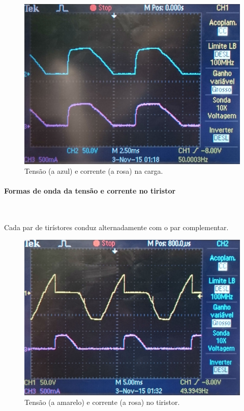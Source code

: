 \documentclass[a4paper,11pt]{article}
\numberwithin{equation}{section}
\begin{document}
\begin{figure}[H]
	\centering
	\includegraphics[keepaspectratio=true, scale=0.13]{img/DSC_0182}
	\caption{Tensão (a azul) e corrente (a rosa) na carga.}
	\label{fig:tccarga}
	\vspace{-0.8em}
\end{figure}

\paragraph{Formas de onda da tensão e corrente no tiristor} \mbox{}\

Cada par de tirístores conduz alternadamente com o par complementar.

\begin{figure}[H]
	\centering
	\includegraphics[keepaspectratio=true, scale=0.13]{img/DSC_0183}
	\caption{Tensão (a amarelo) e corrente (a rosa) no tiristor.}
	\label{fig:tctiristor}
	\vspace{-0.8em}
\end{figure}
\end{document}
